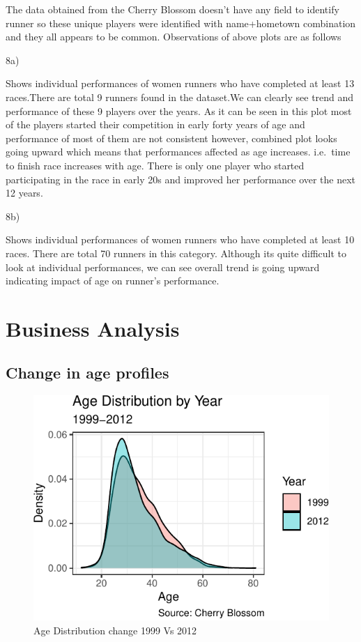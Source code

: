 \documentclass[
]{article}
\begin{document}
The data obtained from the Cherry Blossom doesn't have any field to
identify runner so these unique players were identified with
name+hometown combination and they all appears to be common.
Observations of above plots are as follows

8a)

Shows individual performances of women runners who have completed at
least 13 races.There are total 9 runners found in the dataset.We can
clearly see trend and performance of these 9 players over the years. As
it can be seen in this plot most of the players started their
competition in early forty years of age and performance of most of them
are not consistent however, combined plot looks going upward which means
that performances affected as age increases. i.e.~time to finish race
increases with age. There is only one player who started participating
in the race in early 20s and improved her performance over the next 12
years.

8b)

Shows individual performances of women runners who have completed at
least 10 races. There are total 70 runners in this category. Although
its quite difficult to look at individual performances, we can see
overall trend is going upward indicating impact of age on runner's
performance.

\newpage

\hypertarget{business-analysis}{%
\section{Business Analysis}\label{business-analysis}}

\hypertarget{change-in-age-profiles}{%
\subsection{Change in age profiles}\label{change-in-age-profiles}}

\begin{figure}[H]

{\centering \includegraphics{case_study02_files/figure-latex/unnamed-chunk-17-1} 

}

\caption{Age Distribution change 1999 Vs 2012}\label{fig:unnamed-chunk-17}
\end{figure}
\end{document}
